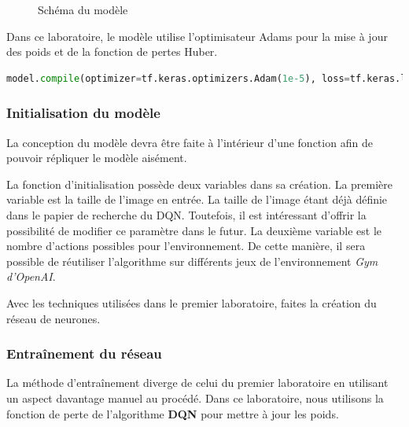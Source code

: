 \documentclass{article}
\begin{document}
\begin{figure}[H]
  \centering
  \caption{Schéma du modèle}
  \label{fig:modele}
\end{figure}

Dans ce laboratoire, le modèle utilise l'optimisateur Adams pour la mise à jour des poids et de la fonction de pertes Huber.
\bigbreak
\begin{lstlisting}[language=Python, caption={Compilation du modèle}, label={code:compile}]
model.compile(optimizer=tf.keras.optimizers.Adam(1e-5), loss=tf.keras.losses.Huber())
\end{lstlisting}

\subsubsection{Initialisation du modèle}
La conception du modèle devra être faite à l'intérieur d'une fonction afin de pouvoir répliquer le modèle aisément.

\bigbreak
La fonction d'initialisation possède deux variables dans sa création. La première variable est la taille de l'image en entrée. La taille de l'image étant déjà définie dans le papier de recherche du DQN. Toutefois, il est intéressant d'offrir la possibilité de modifier ce paramètre dans le futur. La deuxième variable est le nombre d'actions possibles pour l'environnement. De cette manière, il sera possible de réutiliser l'algorithme sur différents jeux de l'environnement \textit{Gym d'OpenAI}.



\bigbreak
Avec les techniques utilisées dans le premier laboratoire, faites la création du réseau de neurones.

\subsubsection{Entraînement du réseau}
La méthode d'entraînement diverge de celui du premier laboratoire en utilisant un aspect davantage manuel au procédé. Dans ce laboratoire, nous utilisons la fonction de perte de l'algorithme \textbf{DQN} pour mettre à jour les poids.
\end{document}
